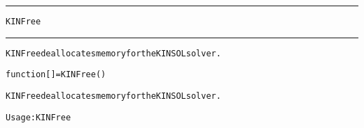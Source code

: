 \begin{samepage}
\hrule
\begin{center}
{\large \verb!KINFree!}
\label{p:KINFree}
\end{center}
\hrule\vspace{0.1in}



\begin{alltt}
KINFree deallocates memory for the KINSOL solver.
\end{alltt}

\end{samepage}



\begin{samepage}


\begin{alltt}
function [] = KINFree() 
\end{alltt}

\end{samepage}



\begin{alltt}
KINFree deallocates memory for the KINSOL solver.

   Usage:  KINFree
\end{alltt}






\vspace{0.1in}